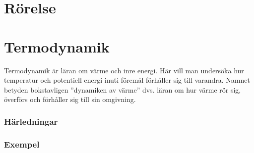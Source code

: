 \documentclass[12pt, a4paper]{article}
\theoremstyle{definition}
\begin{document}
\part{Rörelse}


\part{Termodynamik}
Termodynamik är läran om värme och inre energi. Här vill man undersöka hur temperatur och potentiell energi inuti föremål förhåller sig till varandra. Namnet betyden bokstavligen ''dynamiken av värme'' dvs. läran om hur värme rör sig, överförs och förhåller sig till sin omgivning.


\newpage
\appendix
\section{Härledningar}
\label{appendix:härledning}

\section{Exempel}
\label{appendix:exempel}
\end{document}
